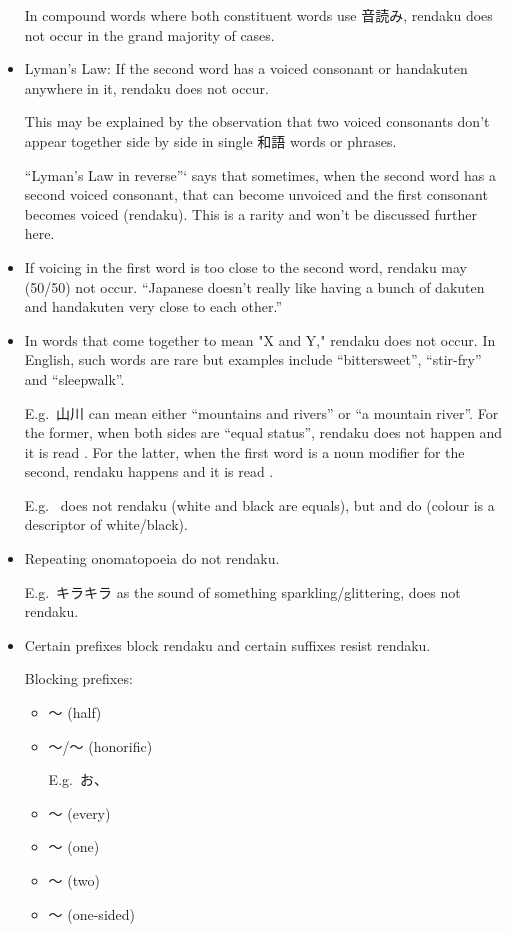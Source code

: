 \documentclass[../nihongo-gakushuu-kyouzai.tex]{subfiles}
\begin{document}
\begin{itemize}
    In  compound words where both constituent words use 音読み, rendaku does not occur in the grand majority of cases.

    \item Lyman's Law: If the second word has a voiced consonant or handakuten anywhere in it, rendaku does not occur.

    This may be explained by the observation that two voiced consonants don't appear together side by side in single 和語 words or phrases.

    ``Lyman's Law in reverse''` says that sometimes, when the second word has a second voiced consonant, that can become unvoiced and the first consonant becomes voiced (rendaku). This is a rarity and won't be discussed further here.
    \item If voicing in the first word is too close to the second word, rendaku may (50/50) not occur. ``Japanese doesn't really like having a bunch of dakuten and handakuten very close to each other.''
    \item In words that come together to mean "X and Y," rendaku does not occur. In English, such words are rare but examples include ``bittersweet'', ``stir-fry'' and ``sleepwalk''.

    E.g.\ 山川 can mean either ``mountains and rivers'' or ``a mountain river''. For the former, when both sides are ``equal status'', rendaku does not happen and it is read . For the latter, when the first word is a noun modifier for the second, rendaku happens and it is read .

    E.g.\  does not rendaku (white and black are equals), but  and  do (colour is a descriptor of white/black).
    \item Repeating onomatopoeia do not rendaku.

    E.g.\ キラキラ as the sound of something sparkling/glittering, does not rendaku.
    \item Certain prefixes block rendaku and certain suffixes resist rendaku.

    Blocking prefixes:
    \begin{itemize}
        \item {}〜 (half)
        \item {}〜/〜 (honorific)

        E.g.\ お、
        \item {}〜 (every)
        \item {}〜 (one)
        \item {}〜 (two)
        \item {}〜 (one-sided)


\end{itemize}
\end{itemize}
\end{document}
